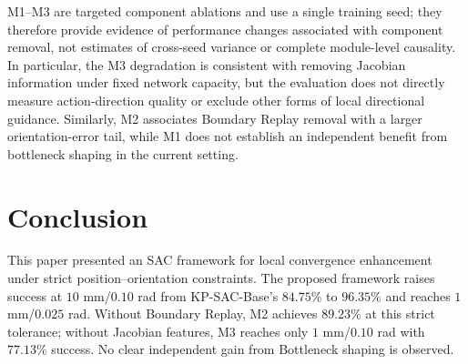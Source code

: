 \documentclass[conference]{IEEEtran}
\begin{document}
M1--M3 are targeted component ablations and use a single training seed; they therefore provide evidence of performance changes associated with component removal, not estimates of cross-seed variance or complete module-level causality. In particular, the M3 degradation is consistent with removing Jacobian information under fixed network capacity, but the evaluation does not directly measure action-direction quality or exclude other forms of local directional guidance. Similarly, M2 associates Boundary Replay removal with a larger orientation-error tail, while M1 does not establish an independent benefit from bottleneck shaping in the current setting.

\section{Conclusion}
This paper presented an SAC framework for local convergence enhancement under strict position--orientation constraints. The proposed framework raises success at $10$ mm/$0.10$ rad from KP-SAC-Base's $84.75\%$ to $96.35\%$ and reaches $1$ mm/$0.025$ rad. Without Boundary Replay, M2 achieves $89.23\%$ at this strict tolerance; without Jacobian features, M3 reaches only $1$ mm/$0.10$ rad with $77.13\%$ success. No clear independent gain from Bottleneck shaping is observed.
\end{document}
